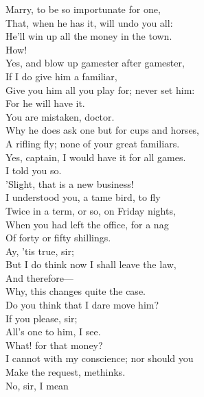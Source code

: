 \documentclass[a4paper,oneside,12pt]{memoir}
\begin{document}
\begin{drama*}
\subtlespeaks Marry, to be so importunate for one,\\
That, when he has it, will undo you all:\\
He'll win up all the money in the town.\\
\facespeaks How!\\
\subtlespeaks {} Yes, and blow up gamester after gamester,\\
If I do give him a familiar,\\
Give you him all you play for; never set him:\\
For he will have it.\\
\facespeaks {} You are mistaken, doctor.\\
Why he does ask one but for cups and horses,\\
A rifling fly; none of your great familiars.\\
\dapperspeaks Yes, captain, I would have it for all games.\\
\subtlespeaks I told you so.\\
\facespeaks {}  'Slight, that is a new business!\\
I understood you, a tame bird, to fly\\
Twice in a term, or so, on Friday nights,\\
When you had left the office, for a nag\\
Of forty or fifty shillings.\\
\dapperspeaks {} Ay, 'tis true, sir;\\
But I do think now I shall leave the law,\\
And therefore---\\
\facespeaks {} Why, this changes quite the case.\\
Do you think that I dare move him?\\
\dapperspeaks {} If you please, sir;\\
All's one to him, I see.\\
\facespeaks {} What! for that money?\\
I cannot with my conscience; nor should you\\
Make the request, methinks.\\
\dapperspeaks {} No, sir, I mean\\

\end{drama*}
\end{document}
